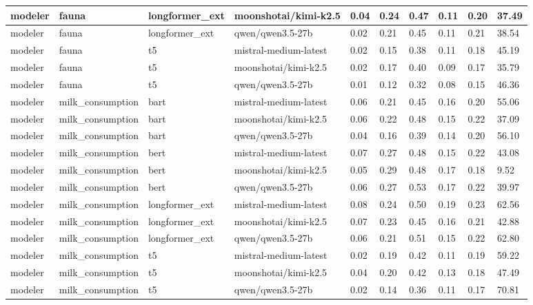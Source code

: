 \begin{tabular}{|l|l|l|l|l|l|l|l|l|l|}
 modeler & fauna & longformer\_ext & moonshotai/kimi-k2.5 & 0.04 & 0.24 & 0.47 & 0.11 & 0.20 & 37.49 \\
 \hline
 modeler & fauna & longformer\_ext & qwen/qwen3.5-27b & 0.02 & 0.21 & 0.45 & 0.11 & 0.21 & 38.54 \\
 \hline
 modeler & fauna & t5 & mistral-medium-latest & 0.02 & 0.15 & 0.38 & 0.11 & 0.18 & 45.19 \\
 \hline
 modeler & fauna & t5 & moonshotai/kimi-k2.5 & 0.02 & 0.17 & 0.40 & 0.09 & 0.17 & 35.79 \\
 \hline
 modeler & fauna & t5 & qwen/qwen3.5-27b & 0.01 & 0.12 & 0.32 & 0.08 & 0.15 & 46.36 \\
 \hline
 modeler & milk\_consumption & bart & mistral-medium-latest & 0.06 & 0.21 & 0.45 & 0.16 & 0.20 & 55.06 \\
 \hline
 modeler & milk\_consumption & bart & moonshotai/kimi-k2.5 & 0.06 & 0.22 & 0.48 & 0.15 & 0.22 & 37.09 \\
 \hline
 modeler & milk\_consumption & bart & qwen/qwen3.5-27b & 0.04 & 0.16 & 0.39 & 0.14 & 0.20 & 56.10 \\
 \hline
 modeler & milk\_consumption & bert & mistral-medium-latest & 0.07 & 0.27 & 0.48 & 0.15 & 0.22 & 43.08 \\
 \hline
 modeler & milk\_consumption & bert & moonshotai/kimi-k2.5 & 0.05 & 0.29 & 0.48 & 0.17 & 0.18 & 9.52 \\
 \hline
 modeler & milk\_consumption & bert & qwen/qwen3.5-27b & 0.06 & 0.27 & 0.53 & 0.17 & 0.22 & 39.97 \\
 \hline
 modeler & milk\_consumption & longformer\_ext & mistral-medium-latest & 0.08 & 0.24 & 0.50 & 0.19 & 0.23 & 62.56 \\
 \hline
 modeler & milk\_consumption & longformer\_ext & moonshotai/kimi-k2.5 & 0.07 & 0.23 & 0.45 & 0.16 & 0.21 & 42.88 \\
 \hline
 modeler & milk\_consumption & longformer\_ext & qwen/qwen3.5-27b & 0.06 & 0.21 & 0.51 & 0.15 & 0.22 & 62.80 \\
 \hline
 modeler & milk\_consumption & t5 & mistral-medium-latest & 0.02 & 0.19 & 0.42 & 0.11 & 0.19 & 59.22 \\
 \hline
 modeler & milk\_consumption & t5 & moonshotai/kimi-k2.5 & 0.04 & 0.20 & 0.42 & 0.13 & 0.18 & 47.49 \\
 \hline
 modeler & milk\_consumption & t5 & qwen/qwen3.5-27b & 0.02 & 0.14 & 0.36 & 0.11 & 0.17 & 70.81 \\
\hline
\end{tabular}
